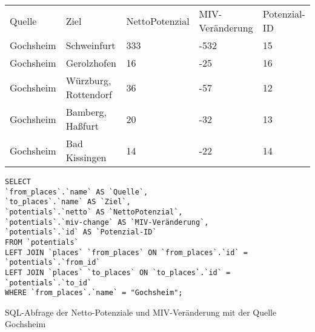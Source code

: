 \begin{tabular}{ l  l  l  l  l }
    Quelle & Ziel & NettoPotenzial & MIV-Veränderung & Potenzial-ID\\ 
    Gochsheim & Schweinfurt & 333 & -532 & 15\\ 
    Gochsheim & Gerolzhofen & 16 & -25 & 16\\ 
    Gochsheim & Würzburg, Rottendorf & 36 & -57 & 12\\ 
    Gochsheim & Bamberg, Haßfurt & 20 & -32 & 13\\ 
    Gochsheim & Bad Kissingen & 14 & -22 & 14\\ 
    \end{tabular}    
\newline
\newline
\begin{listing}[htbp]
\begin{verbatim}
SELECT
`from_places`.`name` AS `Quelle`, 
`to_places`.`name` AS `Ziel`, 
`potentials`.`netto` AS `NettoPotenzial`, 
`potentials`.`miv-change` AS `MIV-Veränderung`, 
`potentials`.`id` AS `Potenzial-ID`
FROM `potentials`
LEFT JOIN `places` `from_places` ON `from_places`.`id` = `potentials`.`from_id`
LEFT JOIN `places` `to_places` ON `to_places`.`id` = `potentials`.`to_id`
WHERE `from_places`.`name` = "Gochsheim";
\end{verbatim}
\caption{SQL-Abfrage der Netto-Potenziale und MIV-Veränderung mit der Quelle Gochsheim}\label{lst-fz-gochsheim}
\end{listing}